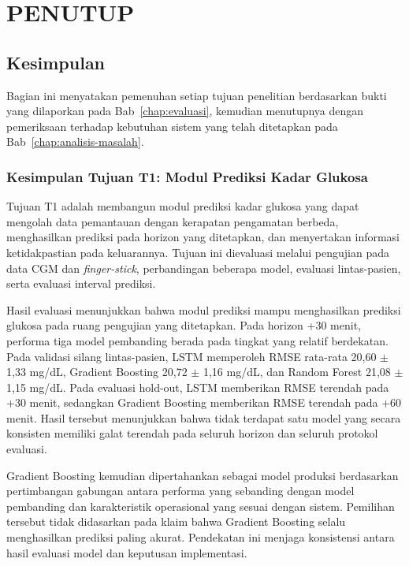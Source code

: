 \cleardoublepage
\chapter{PENUTUP}
\label{chap:penutup}

\section{Kesimpulan}
\label{sec:bab7-kesimpulan}

Bagian ini menyatakan pemenuhan setiap tujuan penelitian berdasarkan bukti yang dilaporkan pada Bab~\ref{chap:evaluasi}, kemudian menutupnya dengan
pemeriksaan terhadap kebutuhan sistem yang telah ditetapkan pada Bab~\ref{chap:analisis-masalah}.

\subsection{Kesimpulan Tujuan T1: Modul Prediksi Kadar Glukosa}
\label{subsec:bab7-kesimpulan-t1}

Tujuan T1 adalah membangun modul prediksi kadar glukosa yang dapat mengolah data pemantauan dengan kerapatan pengamatan berbeda, menghasilkan prediksi pada
horizon yang ditetapkan, dan menyertakan informasi ketidakpastian pada keluarannya. Tujuan ini dievaluasi melalui pengujian pada data CGM dan
\textit{finger-stick}, perbandingan beberapa model, evaluasi lintas-pasien, serta evaluasi interval prediksi.

Hasil evaluasi menunjukkan bahwa modul prediksi mampu menghasilkan prediksi glukosa pada ruang pengujian yang ditetapkan. Pada horizon +30 menit,
performa tiga model pembanding berada pada tingkat yang relatif berdekatan. Pada validasi silang lintas-pasien, LSTM memperoleh RMSE rata-rata
20,60 $\pm$ 1,33 mg/dL, Gradient Boosting 20,72 $\pm$ 1,16 mg/dL, dan Random Forest 21,08 $\pm$ 1,15 mg/dL. Pada evaluasi hold-out, LSTM
memberikan RMSE terendah pada +30 menit, sedangkan Gradient Boosting memberikan RMSE terendah pada +60 menit. Hasil tersebut menunjukkan bahwa
tidak terdapat satu model yang secara konsisten memiliki galat terendah pada seluruh horizon dan seluruh protokol evaluasi.

Gradient Boosting kemudian dipertahankan sebagai model produksi berdasarkan pertimbangan gabungan antara performa yang sebanding dengan model pembanding
dan karakteristik operasional yang sesuai dengan sistem. Pemilihan tersebut tidak didasarkan pada klaim bahwa Gradient Boosting selalu menghasilkan
prediksi paling akurat. Pendekatan ini menjaga konsistensi antara hasil evaluasi model dan keputusan implementasi.

